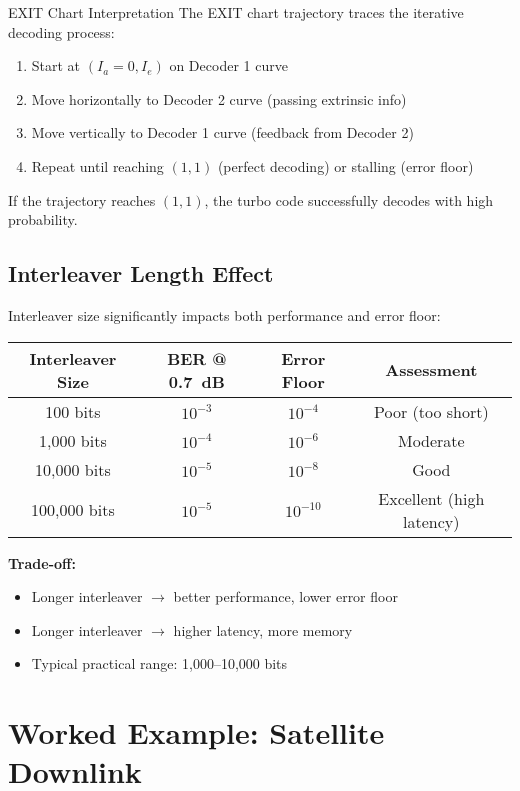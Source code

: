\begin{calloutbox}{EXIT Chart Interpretation}
The EXIT chart trajectory traces the iterative decoding process:
\begin{enumerate}
\item Start at $(I_a = 0, I_e)$ on Decoder 1 curve
\item Move horizontally to Decoder 2 curve (passing extrinsic info)
\item Move vertically to Decoder 1 curve (feedback from Decoder 2)
\item Repeat until reaching $(1, 1)$ (perfect decoding) or stalling (error floor)
\end{enumerate}

If the trajectory reaches $(1, 1)$, the turbo code successfully decodes with high probability.
\end{calloutbox}

\subsection{Interleaver Length Effect}

Interleaver size significantly impacts both performance and error floor:

\begin{center}
\begin{tabular}{@{}cccc@{}}
\toprule
Interleaver Size & BER @ 0.7~dB & Error Floor & Assessment \\
\midrule
100 bits & $10^{-3}$ & $10^{-4}$ & Poor (too short) \\
1,000 bits & $10^{-4}$ & $10^{-6}$ & Moderate \\
10,000 bits & $10^{-5}$ & $10^{-8}$ & Good \\
100,000 bits & $10^{-5}$ & $10^{-10}$ & Excellent (high latency) \\
\bottomrule
\end{tabular}
\end{center}

\textbf{Trade-off:}
\begin{itemize}
\item Longer interleaver $\rightarrow$ better performance, lower error floor
\item Longer interleaver $\rightarrow$ higher latency, more memory
\item Typical practical range: 1,000--10,000 bits
\end{itemize}

\section{Worked Example: Satellite Downlink}

